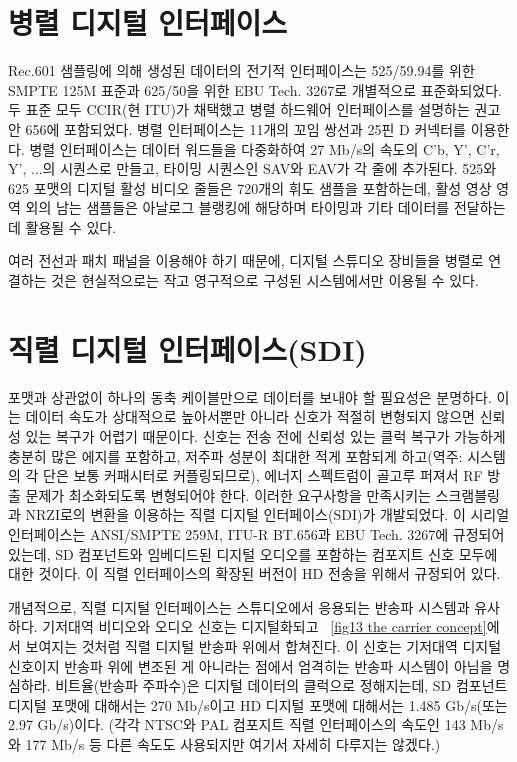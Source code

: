 \section{병렬 디지털 인터페이스}
Rec.601 샘플링에 의해 생성된 데이터의 전기적 인터페이스는 525/59.94를 위한 SMPTE 125M 표준과 625/50을 위한 EBU Tech. 3267로 개별적으로 표준화되었다. 두 표준 모두 CCIR(현 ITU)가 채택했고 병렬 하드웨어 인터페이스를 설명하는 권고안 656에 포함되었다.
병렬 인터페이스는 11개의 꼬임 쌍선과 25핀 D 커넥터를 이용한다. 병렬 인터페이스는 데이터 워드들을 다중화하여 27 Mb/s의 속도의 C'b, Y', C'r, Y', ...의 시퀀스로 만들고, 타이밍 시퀀스인 SAV와 EAV가 각 줄에 추가된다.
525와 625 포맷의 디지털 활성 비디오 줄들은 720개의 휘도 샘플을 포함하는데, 활성 영상 영역 외의 남는 샘플들은 아날로그 블랭킹에 해당하며 타이밍과 기타 데이터를 전달하는 데 활용될 수 있다.

여러 전선과 패치 패널을 이용해야 하기 때문에, 디지털 스튜디오 장비들을 병렬로 연결하는 것은 현실적으로는 작고 영구적으로 구성된 시스템에서만 이용될 수 있다.

\section{직렬 디지털 인터페이스(SDI)}
포맷과 상관없이 하나의 동축 케이블만으로 데이터를 보내야 할 필요성은 분명하다. 이는 데이터 속도가 상대적으로 높아서뿐만 아니라 신호가 적절히 변형되지 않으면 신뢰성 있는 복구가 어렵기 때문이다.
신호는 전송 전에 신뢰성 있는 클럭 복구가 가능하게 충분히 많은 에지를 포함하고, 저주파 성분이 최대한 적게 포함되게 하고(역주: 시스템의 각 단은 보통 커패시터로 커플링되므로), 에너지 스펙트럼이 골고루 퍼져서 RF 방출 문제가 최소화되도록 변형되어야 한다.
이러한 요구사항을 만족시키는 스크램블링과 NRZI로의 변환을 이용하는 직렬 디지털 인터페이스(SDI)가 개발되었다. 이 시리얼 인터페이스는 ANSI/SMPTE 259M, ITU-R BT.656과 EBU Tech. 3267에 규정되어 있는데, SD 컴포넌트와 임베디드된 디지털 오디오를 포함하는 컴포지트 신호 모두에 대한 것이다.
이 직렬 인터페이스의 확장된 버전이 HD 전송을 위해서 규정되어 있다.

개념적으로, 직렬 디지털 인터페이스는 스튜디오에서 응용되는 반송파 시스템과 유사하다. 기저대역 비디오와 오디오 신호는 디지털화되고 \figurename~\ref{fig13 the carrier concept}에서 보여지는 것처럼 직렬 디지털 반송파 위에서 합쳐진다.
이 신호는 기저대역 디지털 신호이지 반송파 위에 변조된 게 아니라는 점에서 엄격히는 반송파 시스템이 아님을 명심하라.
비트율(반송파 주파수)은 디지털 데이터의 클럭으로 정해지는데, SD 컴포넌트 디지털 포맷에 대해서는 270 Mb/s이고 HD 디지털 포맷에 대해서는 1.485 Gb/s(또는 2.97 Gb/s)이다. (각각 NTSC와 PAL 컴포지트 직렬 인터페이스의 속도인 143 Mb/s와 177 Mb/s 등 다른 속도도 사용되지만 여기서 자세히 다루지는 않겠다.)

